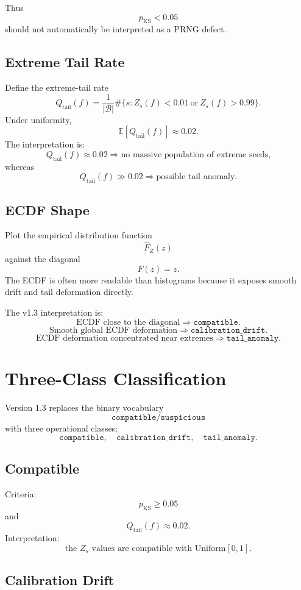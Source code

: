 \documentclass[11pt,a4paper]{article}
\newcommand{\Unif}{\mathrm{Uniform}}
\newcommand{\Qtail}{Q_{\mathrm{tail}}}
\newcommand{\KS}{\mathrm{KS}}
\begin{document}
Thus
\[
p_{\KS}<0.05
\]
should not automatically be interpreted as a PRNG defect.

\subsection{Extreme Tail Rate}

Define the extreme-tail rate
\[
\Qtail(f)
=
\frac1{|\mathcal B|}
\#\{s:Z_s(f)<0.01\ \text{or}\ Z_s(f)>0.99\}.
\]
Under uniformity,
\[
\mathbb E[\Qtail(f)]\approx0.02.
\]
The interpretation is:
\[
\Qtail(f)\approx0.02
\Rightarrow
\text{no massive population of extreme seeds,}
\]
whereas
\[
\Qtail(f)\gg0.02
\Rightarrow
\text{possible tail anomaly.}
\]

\subsection{ECDF Shape}

Plot the empirical distribution function
\[
\widehat F_Z(z)
\]
against the diagonal
\[
F(z)=z.
\]
The ECDF is often more readable than histograms because it exposes smooth drift and tail deformation directly.

The v1.3 interpretation is:
\[
\boxed{
\text{ECDF close to the diagonal}\Rightarrow \texttt{compatible}.
}
\]
\[
\boxed{
\text{Smooth global ECDF deformation}\Rightarrow \texttt{calibration\_drift}.
}
\]
\[
\boxed{
\text{ECDF deformation concentrated near extremes}\Rightarrow \texttt{tail\_anomaly}.
}
\]

\section{Three-Class Classification}

Version 1.3 replaces the binary vocabulary
\[
\texttt{compatible}/\texttt{suspicious}
\]
with three operational classes:
\[
\boxed{
\texttt{compatible},\quad
\texttt{calibration\_drift},\quad
\texttt{tail\_anomaly}.
}
\]

\subsection{Compatible}

Criteria:
\[
p_{\KS}\geq0.05
\]
and
\[
\Qtail(f)\approx0.02.
\]
Interpretation:
\[
\boxed{
\text{the }Z_s\text{ values are compatible with }\Unif[0,1].
}
\]

\subsection{Calibration Drift}
\end{document}
